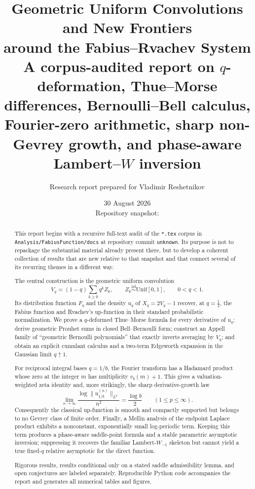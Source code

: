 \documentclass[11pt,oneside]{article}
\title{\textbf{Geometric Uniform Convolutions and New Frontiers\\around the Fabius--Rvachev System}\\[0.7ex]
\large A corpus-audited report on $q$-deformation, Thue--Morse differences,
Bernoulli--Bell calculus, Fourier-zero arithmetic, sharp non-Gevrey growth,
and phase-aware Lambert--$W$ inversion}
\author{Research report prepared for Vladimir Reshetnikov}
\date{30 August 2026\\Repository snapshot: \RepoCommit}
\theoremstyle{definition}
\theoremstyle{remark}
\newcommand{\RepoCommit}{\texttt{unknown}}
\begin{document}
\maketitle

\begin{abstract}
This report begins with a recursive full-text audit of the \texttt{*.tex} corpus in
\nolinkurl{Analysis/FabiusFunction/docs} at repository commit \RepoCommit.  Its purpose is
not to repackage the substantial material already present there, but to develop a
coherent collection of results that are new relative to that snapshot and that connect
several of its recurring themes in a different way.

The central construction is the geometric uniform convolution
\[
 V_q=(1-q)\sum_{k\ge0}q^k Z_k,\qquad Z_k\stackrel{\mathrm{iid}}\sim\mathrm{Unif}[0,1],
 \qquad 0<q<1.
\]
Its distribution function $F_q$ and the density $u_q$ of $X_q=2V_q-1$ recover,
at $q=\tfrac12$, the Fabius function and Rvachev's up-function in their standard
probabilistic normalization.  We prove a $q$-deformed Thue--Morse formula for every
derivative of $u_q$; derive geometric Prouhet sums in closed Bell--Bernoulli form;
construct an Appell family of ``geometric Bernoulli polynomials'' that exactly inverts
averaging by $V_q$; and obtain an explicit cumulant calculus and a two-term Edgeworth
expansion in the Gaussian limit $q\uparrow1$.

For reciprocal integral bases $q=1/b$, the Fourier transform has a Hadamard product
whose zero at the integer $m$ has multiplicity $v_b(m)+1$.  This gives a
valuation-weighted zeta identity and, more strikingly, the sharp derivative-growth law
\[
 \lim_{n\to\infty}\frac{\log\|u_{1/b}^{(n)}\|_{L^p}}{n^2}
   =\frac{\log b}{2}\qquad(1\le p\le\infty).
\]
Consequently the classical up-function is smooth and compactly supported but belongs
to no Gevrey class of finite order.  Finally, a Mellin analysis of the endpoint
Laplace product exhibits a nonconstant, exponentially small log-periodic term.  Keeping
this term produces a phase-aware saddle-point formula and a stable parametric
asymptotic inversion; suppressing it recovers the familiar Lambert-$W_{-1}$ skeleton
but cannot yield a true fixed-$q$ relative asymptotic for the direct function.

Rigorous results, results conditional only on a stated saddle admissibility lemma, and
open conjectures are labeled separately.  Reproducible Python code accompanies the
report and generates all numerical tables and figures.
\end{abstract}
\end{document}
